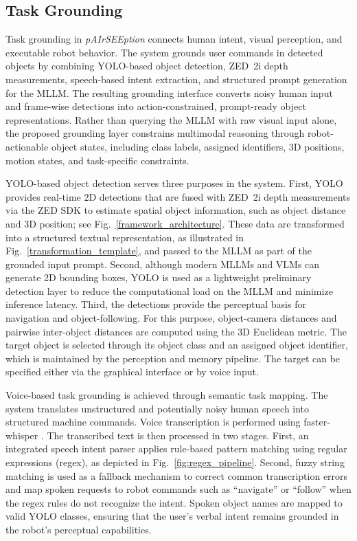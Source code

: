 \documentclass[lettersize,journal]{IEEEtran}
\begin{document}
\subsection{Task Grounding}
\label{taskgrounding}

Task grounding in \textit{pAIrSEEption} connects human intent, visual perception, and executable robot behavior. The system grounds user commands in detected objects by combining YOLO-based object detection, ZED~2i depth measurements, speech-based intent extraction, and structured prompt generation for the MLLM. The resulting grounding interface converts noisy human input and frame-wise detections into action-constrained, prompt-ready object representations. Rather than querying the MLLM with raw visual input alone, the proposed grounding layer constrains multimodal reasoning through robot-actionable object states, including class labels, assigned identifiers, 3D positions, motion states, and task-specific constraints.

YOLO-based object detection serves three purposes in the system. First, YOLO provides real-time 2D detections that are fused with ZED~2i depth measurements via the ZED SDK to estimate spatial object information, such as object distance and 3D position; see Fig.~\ref{framework_architecture}. These data are transformed into a structured textual representation, as illustrated in Fig.~\ref{transformation_template}, and passed to the MLLM as part of the grounded input prompt. Second, although modern MLLMs and VLMs can generate 2D bounding boxes, YOLO is used as a lightweight preliminary detection layer to reduce the computational load on the MLLM and minimize inference latency. Third, the detections provide the perceptual basis for navigation and object-following. For this purpose, object-camera distances and pairwise inter-object distances are computed using the 3D Euclidean metric. The target object is selected through its object class and an assigned object identifier, which is maintained by the perception and memory pipeline. The target can be specified either via the graphical interface or by voice input.

Voice-based task grounding is achieved through semantic task mapping. The system translates unstructured and potentially noisy human speech into structured machine commands. Voice transcription is performed using faster-whisper \cite{fasterwhisper}. The transcribed text is then processed in two stages. First, an integrated speech intent parser applies rule-based pattern matching using regular expressions (regex), as depicted in Fig.~\ref{fig:regex_pipeline}. Second, fuzzy string matching is used as a fallback mechanism to correct common transcription errors and map spoken requests to robot commands such as ``navigate'' or ``follow'' when the regex rules do not recognize the intent. Spoken object names are mapped to valid YOLO classes, ensuring that the user's verbal intent remains grounded in the robot's perceptual capabilities.
\end{document}
